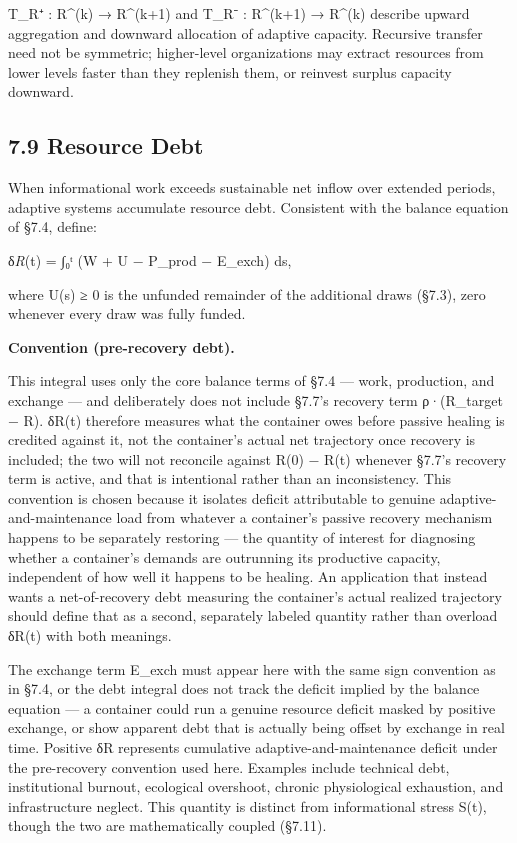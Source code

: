 \documentclass[
]{article}
\begin{document}
T\_R⁺ : R\^{}(k) → R\^{}(k+1) and T\_R⁻ : R\^{}(k+1) → R\^{}(k) describe
upward aggregation and downward allocation of adaptive capacity.
Recursive transfer need not be symmetric; higher-level organizations may
extract resources from lower levels faster than they replenish them, or
reinvest surplus capacity downward.

\hypertarget{resource-debt}{%
\subsection{7.9 Resource Debt}\label{resource-debt}}

When informational work exceeds sustainable net inflow over extended
periods, adaptive systems accumulate resource debt. Consistent with the
balance equation of §7.4, define:

δ\emph{R}(t) = ∫₀ᵗ (W + U − P\_prod − E\_exch) ds,

where U(s) ≥ 0 is the unfunded remainder of the additional draws (§7.3),
zero whenever every draw was fully funded.

\textbf{Convention (pre-recovery debt).}

This integral uses only the core balance terms of §7.4 --- work,
production, and exchange --- and deliberately does not include §7.7's
recovery term ρ·(R\_target − R). δR(t) therefore measures what the
container owes before passive healing is credited against it, not the
container's actual net trajectory once recovery is included; the two
will not reconcile against R(0) − R(t) whenever §7.7's recovery term is
active, and that is intentional rather than an inconsistency. This
convention is chosen because it isolates deficit attributable to genuine
adaptive-and-maintenance load from whatever a container's passive
recovery mechanism happens to be separately restoring --- the quantity
of interest for diagnosing whether a container's demands are outrunning
its productive capacity, independent of how well it happens to be
healing. An application that instead wants a net-of-recovery debt
measuring the container's actual realized trajectory should define that
as a second, separately labeled quantity rather than overload δR(t) with
both meanings.

The exchange term E\_exch must appear here with the same sign convention
as in §7.4, or the debt integral does not track the deficit implied by
the balance equation --- a container could run a genuine resource
deficit masked by positive exchange, or show apparent debt that is
actually being offset by exchange in real time. Positive δR represents
cumulative adaptive-and-maintenance deficit under the pre-recovery
convention used here. Examples include technical debt, institutional
burnout, ecological overshoot, chronic physiological exhaustion, and
infrastructure neglect. This quantity is distinct from informational
stress S(t), though the two are mathematically coupled (§7.11).
\end{document}

